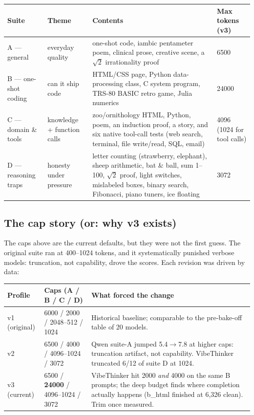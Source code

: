 \documentclass[11pt,a4paper]{article}
\begin{document}
\begin{center}
\small
\begin{tabularx}{\textwidth}{L{2.0cm} L{2.4cm} X L{2.6cm}}
\toprule
\textbf{Suite} & \textbf{Theme} & \textbf{Contents} & \textbf{Max tokens (v3)} \\
\midrule
A --- general & everyday quality & one-shot code, iambic pentameter poem, clinical prose, creative scene, a $\sqrt{2}$ irrationality proof & 6500 \\
B --- one-shot coding & can it ship code & HTML/CSS page, Python data-processing class, C system program, TRS-80 BASIC retro game, Julia numerics & 24000 \\
C --- domain \& tools & knowledge + function calls & zoo/ornithology HTML, Python, poem, an induction proof, a story, and six native tool-call tests (web search, terminal, file write/read, SQL, email) & 4096 (1024 for tool calls) \\
D --- reasoning traps & honesty under pressure & letter counting (strawberry, elephant), sheep arithmetic, bat \& ball, sum 1--100, $\sqrt{2}$ proof, light switches, mislabeled boxes, binary search, Fibonacci, piano tuners, ice floating & 3072 \\
\bottomrule
\end{tabularx}
\end{center}

\subsection{The cap story (or: why v3 exists)}

The caps above are the current defaults, but they were not the first guess.
The original suite ran at 400--1024 tokens, and it systematically punished
verbose models: truncation, not capability, drove the scores. Each revision
was driven by data:

\begin{center}
\small
\begin{tabularx}{\textwidth}{L{2.9cm} X L{4.9cm}}
\toprule
\textbf{Profile} & \textbf{Caps (A / B / C / D)} & \textbf{What forced the change} \\
\midrule
v1 (original) & 6000 / 2000 / 2048--512 / 1024 & Historical baseline; comparable to the pre-bake-off table of 20 models. \\
v2 & 6500 / 4000 / 4096--1024 / 3072 & Qwen suite-A jumped 5.4$\to$7.8 at higher caps: truncation artifact, not capability. VibeThinker truncated 6/12 of suite D at 1024. \\
v3 (current) & 6500 / \textbf{24000} / 4096--1024 / 3072 & VibeThinker hit 2000 \emph{and} 4000 on the same B prompts; the deep budget finds where completion actually happens (b\_html finished at 6{,}326 clean). Trim once measured. \\
\bottomrule
\end{tabularx}
\end{center}
\end{document}
